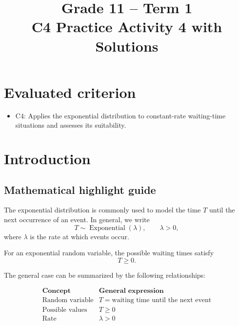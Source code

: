 \makeatletter
{}
\makeatother




\COneTonePracticePalette


\title{Grade 11 -- Term 1 \\ C4 Practice Activity 4 with Solutions}
\author{}
\date{}


\maketitle
\setcounter{tocdepth}{1}
\setcounter{secnumdepth}{2}
\label{toc}
\tableofcontents

\section*{Evaluated criterion}
\begin{itemize}
 \item C4: Applies the exponential distribution to constant-rate waiting-time situations and assesses its suitability.
\end{itemize}

\section*{Introduction}
\subsection*{Mathematical highlight guide}
\label{tone:C4:legend}


The exponential distribution is commonly used to model the time $T$ until the
next occurrence of an event. In general, we write
\[
\boxed{T\sim\operatorname{Exponential}(\lambda)},\qquad \lambda>0,
\]
where $\lambda$ is the rate at which events occur.

For an exponential random variable, the possible waiting times satisfy
\[
\boxed{T\geq0}.
\]

The general case can be summarized by the following relationships:

\[
\begin{array}{c|c}
	\textbf{Concept} & \textbf{General expression}\\[4pt]
	\hline
	\text{Random variable} & T=\text{waiting time until the next event}\\[4pt]
	\text{Possible values} & T\geq0\\[4pt]
	\text{Rate} & \lambda>0
\end{array}
\]

